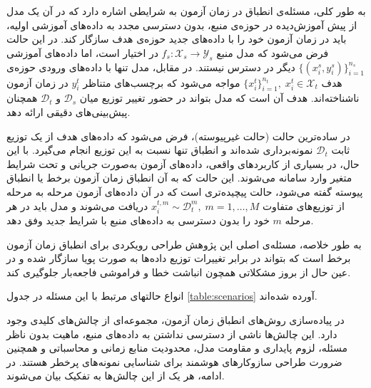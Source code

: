 
به طور کلی، مسئله‌ی انطباق در زمان آزمون به شرایطی اشاره دارد که در آن یک مدل از پیش آموزش‌دیده در حوزه‌ی منبع، بدون دسترسی مجدد به داده‌های آموزشی اولیه، باید در زمان آزمون خود را با داده‌های جدید حوزه‌ی هدف سازگار کند.  
در این حالت فرض می‌شود که مدل منبع \(f_s : \mathcal{X}_s \to \mathcal{Y}_s\) در اختیار است، اما داده‌های آموزشی \(\{(x_i^s, y_i^s)\}_{i=1}^{n_s}\) دیگر در دسترس نیستند. در مقابل، مدل تنها با داده‌های ورودی حوزه‌ی هدف \(\{x_i^t\}_{i=1}^{n_t}, \; x_i^t \in \mathcal{X}_t\) مواجه می‌شود که برچسب‌های متناظر \(y_i^t\) در زمان آزمون ناشناخته‌اند. هدف آن است که مدل بتواند در حضور تغییر توزیع میان \(\mathcal{D}_s\) و \(\mathcal{D}_t\) همچنان پیش‌بینی‌های دقیقی ارائه دهد.  

در ساده‌ترین حالت (حالت غیرپیوسته)، فرض می‌شود که داده‌های هدف از یک توزیع ثابت \(\mathcal{D}_t\) نمونه‌برداری شده‌اند و انطباق تنها نسبت به این توزیع انجام می‌گیرد. با این حال، در بسیاری از کاربردهای واقعی، داده‌های آزمون به‌صورت جریانی و تحت شرایط متغیر وارد سامانه می‌شوند. این حالت که به آن انطباق زمان آزمون برخط یا انطباق پیوسته گفته می‌شود، حالت پیچیده‌تری است که در آن داده‌های آزمون مرحله به مرحله از توزیع‌های متفاوت \(x_i^{t,m} \sim \mathcal{D}_t^m, \; m = 1,\dots,M\) دریافت می‌شوند و مدل باید در هر مرحله \(m\) خود را بدون دسترسی به داده‌های منبع با شرایط جدید وفق دهد.  

به طور خلاصه، مسئله‌ی اصلی این پژوهش طراحی رویکردی برای انطباق زمان آزمون برخط است که بتواند در برابر تغییرات توزیع داده‌ها به صورت پویا سازگار شده و در عین حال از بروز مشکلاتی همچون انباشت خطا و فراموشی فاجعه‌بار جلوگیری کند.  

انواع حالتهای مرتبط با این مسئله در جدول \ref{table:scenarios} آورده شده‌اند.




در پیاده‌سازی روش‌های انطباق زمان آزمون، مجموعه‌ای از چالش‌های کلیدی وجود دارد. 
این چالش‌ها ناشی از دسترسی نداشتن به داده‌های منبع، ماهیت بدون ناظر مسئله، 
لزوم پایداری و مقاومت مدل، محدودیت منابع زمانی و محاسباتی و همچنین ضرورت طراحی سازوکار‌های هوشمند برای شناسایی نمونه‌های پرخطر هستند.
در ادامه، هر یک از این چالش‌ها به تفکیک بیان می‌شوند.

